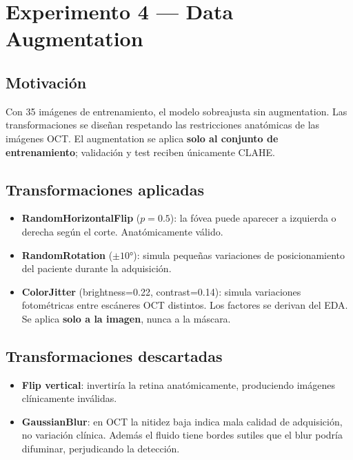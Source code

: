 \documentclass[12pt,a4paper]{article}
\begin{document}
\section{Experimento 4 — Data Augmentation}

\subsection{Motivación}

Con 35 imágenes de entrenamiento, el modelo sobreajusta sin augmentation. Las transformaciones se diseñan respetando las restricciones anatómicas de las imágenes OCT. El augmentation se aplica \textbf{solo al conjunto de entrenamiento}; validación y test reciben únicamente CLAHE.

\subsection{Transformaciones aplicadas}

\begin{itemize}
    \item \textbf{RandomHorizontalFlip} ($p=0.5$): la fóvea puede aparecer a izquierda o derecha según el corte. Anatómicamente válido.
    \item \textbf{RandomRotation} ($\pm10°$): simula pequeñas variaciones de posicionamiento del paciente durante la adquisición.
    \item \textbf{ColorJitter} (brightness=0.22, contrast=0.14): simula variaciones fotométricas entre escáneres OCT distintos. Los factores se derivan del EDA. Se aplica \textbf{solo a la imagen}, nunca a la máscara.
\end{itemize}

\subsection{Transformaciones descartadas}

\begin{itemize}
    \item \textbf{Flip vertical}: invertiría la retina anatómicamente, produciendo imágenes clínicamente inválidas.
    \item \textbf{GaussianBlur}: en OCT la nitidez baja indica mala calidad de adquisición, no variación clínica. Además el fluido tiene bordes sutiles que el blur podría difuminar, perjudicando la detección.
\end{itemize}
\end{document}
